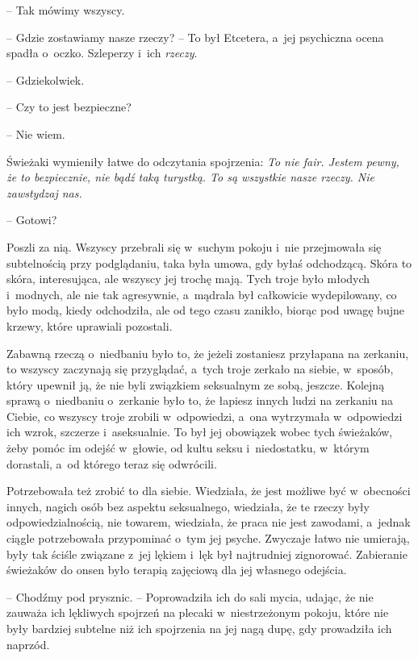 \documentclass[oneside,polish,11pt,sfheadings]{mwbk}
\begin{document}
-- Tak mówimy wszyscy.

-- Gdzie zostawiamy nasze rzeczy? -- To był Etcetera, a~jej psychiczna
ocena spadła o~oczko. Szleperzy i~ich \textit{rzeczy}.

-- Gdziekolwiek.

-- Czy to jest bezpieczne?

-- Nie wiem.

Świeżaki wymieniły łatwe do odczytania spojrzenia: \textit{To nie fair.
Jestem pewny, że to bezpiecznie, nie bądź taką turystką. To są wszystkie
nasze rzeczy. Nie zawstydzaj nas.}

-- Gotowi?

Poszli za nią. Wszyscy przebrali się w~suchym pokoju i~nie przejmowała
się subtelnością przy podglądaniu, taka była umowa, gdy byłaś
odchodzącą. Skóra to skóra, interesująca, ale wszyscy jej trochę mają.
Tych troje było młodych i~modnych, ale nie tak agresywnie, a~mądrala był
całkowicie wydepilowany, co było modą, kiedy odchodziła, ale od tego
czasu zanikło, biorąc pod uwagę bujne krzewy, które uprawiali pozostali.

Zabawną rzeczą o~niedbaniu było to, że jeżeli zostaniesz przyłapana na
zerkaniu, to wszyscy zaczynają się przyglądać, a~tych troje zerkało na
siebie, w~sposób, który upewnił ją, że nie byli związkiem seksualnym ze
sobą, jeszcze. Kolejną sprawą o~niedbaniu o~zerkanie było to, że łapiesz
innych ludzi na zerkaniu na Ciebie, co wszyscy troje zrobili w~odpowiedzi, a~ona wytrzymała w~odpowiedzi ich wzrok, szczerze i~aseksualnie. To był jej obowiązek wobec tych świeżaków, żeby pomóc im
odejść w~głowie, od kultu seksu i~niedostatku, w~którym dorastali, a~od
którego teraz się odwrócili.

Potrzebowała też zrobić to dla siebie. Wiedziała, że jest możliwe być w~obecności innych, nagich osób bez aspektu seksualnego, wiedziała, że te
rzeczy były odpowiedzialnością, nie towarem, wiedziała, że praca nie
jest zawodami, a~jednak ciągle potrzebowała przypominać o~tym jej
psyche. Zwyczaje łatwo nie umierają, były tak ściśle związane z~jej
lękiem i~lęk był najtrudniej zignorować. Zabieranie świeżaków do onsen
było terapią zajęciową dla jej własnego odejścia.

-- Chodźmy pod prysznic. -- Poprowadziła ich do sali mycia, udając, że nie
zauważa ich lękliwych spojrzeń na plecaki w~niestrzeżonym pokoju, które
nie były bardziej subtelne niż ich spojrzenia na jej nagą dupę, gdy
prowadziła ich naprzód.
\end{document}
